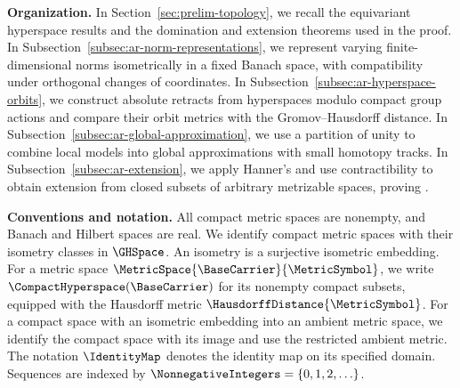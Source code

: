 \medskip
\noindent\textbf{Organization.}
In Section~\ref{sec:prelim-topology},
we recall the equivariant hyperspace results and the domination and
extension theorems used in the proof.
In Subsection~\ref{subsec:ar-norm-representations},
we represent varying finite-dimensional norms isometrically
in a fixed Banach space,
with compatibility under orthogonal changes of coordinates.
In Subsection~\ref{subsec:ar-hyperspace-orbits},
we construct absolute retracts from hyperspaces modulo
compact group actions and compare their orbit metrics with the
Gromov--Hausdorff distance.
In Subsection~\ref{subsec:ar-global-approximation},
we use a partition of unity to combine local models into
global approximations with small homotopy tracks.
In Subsection~\ref{subsec:ar-extension},
we apply Hanner's
and use contractibility to obtain extension from
closed subsets of arbitrary metrizable spaces,
proving .

\medskip
\noindent\textbf{Conventions and notation.}
All compact metric spaces are nonempty,
and Banach and Hilbert spaces are real.
We identify compact metric spaces with their isometry classes in
$\GHSpace$.
An isometry is a surjective isometric embedding.
For a metric space
$\MetricSpace{\BaseCarrier}{\MetricSymbol}$,
we write
$\CompactHyperspace(\BaseCarrier)$
for its nonempty compact subsets,
equipped with the Hausdorff metric
$\HausdorffDistance{\MetricSymbol}$.
For a compact space with an isometric embedding into an ambient metric space,
we identify the compact space with its image and use the restricted ambient metric.
The notation
$\IdentityMap$
denotes the identity map on its specified domain.
Sequences are indexed by
$\NonnegativeIntegers=\{0,1,2,\ldots\}$.
